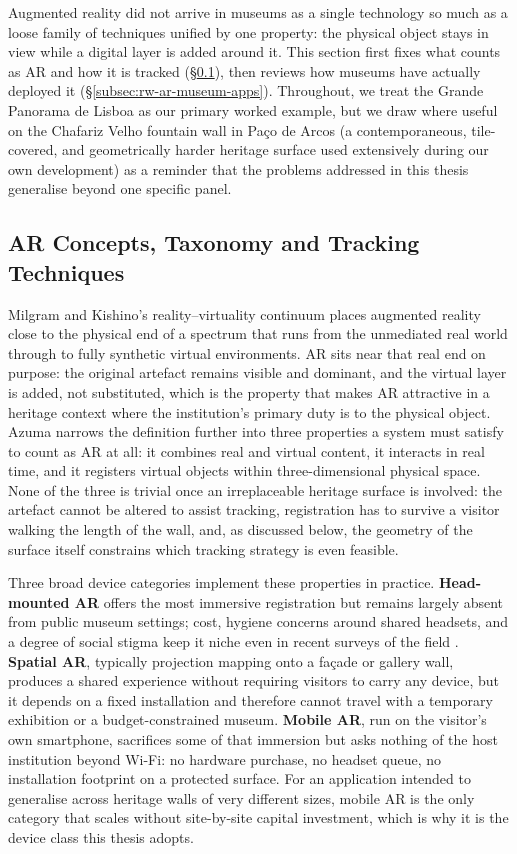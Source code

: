Augmented reality did not arrive in museums as a single technology so
much as a loose family of techniques unified by one property: the
physical object stays in view while a digital layer is added around it.
This section first fixes what counts as AR and how it is tracked
(\S\ref{subsec:rw-ar-concepts-tracking}), then reviews how museums have
actually deployed it (\S\ref{subsec:rw-ar-museum-apps}). Throughout, we
treat the Grande Panorama de Lisboa as our primary worked example, but we
draw where useful on the Chafariz Velho fountain wall in Pa\c{c}o de
Arcos (a contemporaneous, tile-covered, and geometrically harder heritage surface used extensively during our own development) as a
reminder that the problems addressed in this thesis generalise beyond
one specific panel.

\subsection{AR Concepts, Taxonomy and Tracking Techniques}
\label{subsec:rw-ar-concepts-tracking}

Milgram and Kishino's reality--virtuality continuum \cite{milgram1994}
places augmented reality close to the physical end of a spectrum that
runs from the unmediated real world through to fully synthetic virtual
environments. AR sits near that real end on purpose: the original
artefact remains visible and dominant, and the virtual layer is added,
not substituted, which is the property that makes AR
attractive in a heritage context where the institution's primary duty is
to the physical object. Azuma \cite{azuma1997} narrows the definition
further into three properties a system must satisfy to count as AR at
all: it combines real and virtual content, it interacts in real time,
and it registers virtual objects within three-dimensional physical
space. None of the three is trivial once an irreplaceable heritage
surface is involved: the artefact cannot be altered to assist
tracking, registration has to survive a visitor walking the length of
the wall, and, as discussed below, the geometry of the surface itself
constrains which tracking strategy is even feasible.

Three broad device categories implement these properties in practice.
\textbf{Head-mounted AR} offers the most immersive registration but remains
largely absent from public museum settings; cost, hygiene concerns
around shared headsets, and a degree of social stigma keep it niche even
in recent surveys of the field \cite{wang2025grand}. \textbf{Spatial AR}, typically
projection mapping onto a fa\c{c}ade or gallery wall, produces a shared
experience without requiring visitors to carry any device, but it
depends on a fixed installation and therefore cannot travel with a
temporary exhibition or a budget-constrained museum. \textbf{Mobile AR}, run on
the visitor's own smartphone, sacrifices some of that immersion but asks
nothing of the host institution beyond Wi-Fi: no hardware purchase, no
headset queue, no installation footprint on a protected surface. For an
application intended to generalise across heritage walls of very
different sizes, mobile AR is the only category that scales without
site-by-site capital investment, which is why it is the device class
this thesis adopts.


